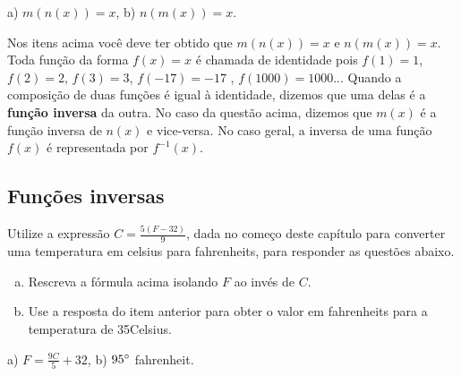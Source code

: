 \documentclass[main.tex]{subfiles}
\begin{document}
\begin{gabarito}
	\begin{gabaritoQuestao}
		a) $m(n(x))=x$, b) $n(m(x))=x$.
	\end{gabaritoQuestao}
\end{gabarito}

Nos itens acima você deve ter obtido que $m(n(x))=x$ e $n(m(x))=x$. Toda função da forma $f(x)=x$ é chamada de identidade pois $f(1)=1$, $f(2)=2$, $f(3)=3$, $f(-17)=-17$ , $f(1000)=1000$... Quando a composição de duas funções é igual à identidade, dizemos que uma delas é a \textbf{função inversa} da outra. No caso da questão acima, dizemos que $m(x)$ é a função inversa de $n(x)$ e vice-versa. No caso geral, a inversa de uma função $f(x)$ é representada por $f^{-1}(x)$.

\subsection*{Funções inversas}


\begin{questao}
Utilize a expressão $C=\frac{5(F-32)}{9}$, dada no começo deste capítulo para converter uma temperatura em celsius para fahrenheits, para responder as questões abaixo.
\begin{enumerate}[a)]
\item Rescreva a fórmula acima isolando $F$ ao invés de $C$.
\item Use a resposta do item anterior para obter o valor em fahrenheits para a temperatura de 35\degree Celsius.
\end{enumerate}
\end{questao}

\begin{gabarito}
	\begin{gabaritoQuestao}
		a) $F=\frac{9C}{5}+32$, b) $95\degree$ fahrenheit.
	\end{gabaritoQuestao}
\end{gabarito}
\end{document}
